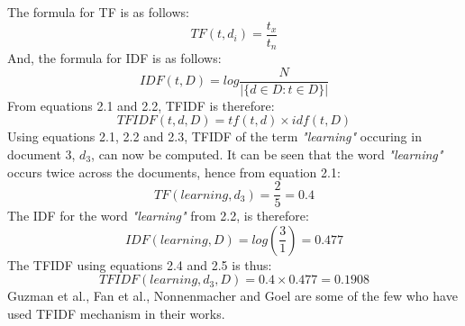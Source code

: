 \documentclass[a4paper,12pt,twoside]{report}
\begin{document}
\newline \newline
The formula for \acs{TF} is as follows:
\newline
\begin{equation}
\label{eq:tfidf1}
    TF(t, d_i) = \frac{t_x}{t_n}
\end{equation}
\newline
And, the formula for \acs{IDF} is as follows:
\newline
\begin{equation}
\label{eq:tfidf2}
    IDF(t, D) = log\frac{N}{|\{d \in D : t \in D\}|}
\end{equation}
\newline
From equations 2.1 and 2.2, \acs{TFIDF} is therefore:
\newline
\begin{equation}
\label{eq:tfidf3}
    TFIDF(t, d, D) = tf(t, d)\times idf(t, D)
\end{equation}
\newline
Using equations 2.1, 2.2 and 2.3, \acs{TFIDF} of the term  \textit{"learning"} occuring in document 3, $d_3$, can now be computed. It can be seen that the word \textit{"learning"} occurs twice across the documents, hence from equation 2.1:
\newline
\begin{equation}
\label{eq:tfidf4}
    TF(learning, d_3) = \frac{2}{5} = 0.4
\end{equation}
\newline
The IDF for the word \textit{"learning"} from 2.2, is therefore:
\newline
\begin{equation}
\label{eq:tfidf5}
    IDF(learning, D) = log(\frac{3}{1}) = 0.477
\end{equation}
\newline
The \acs{TFIDF} using equations 2.4 and 2.5 is thus:
\newline
\begin{equation}
\label{eq:tfidf6}
    TFIDF(learning, d_3, D) = 0.4\times0.477 = 0.1908
\end{equation}
\newline 
Guzman et al.\cite{Guzman2017}, Fan et al.\cite{Fan2017}, Nonnenmacher\cite{Nonnenmacher2017} and Goel \cite{Goel2017} are some of the few who have used \acs{TFIDF} mechanism in their works.
  
\end{document}
